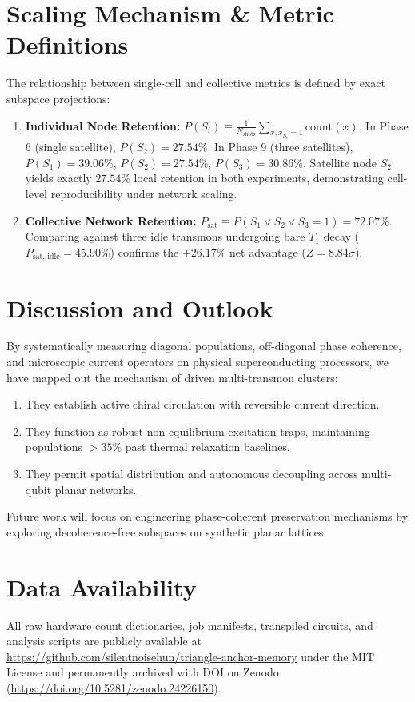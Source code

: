 \documentclass[aps,pra,twocolumn,superscriptaddress,floatfix,10pt]{revtex4-2}
\begin{document}
\section{Scaling Mechanism \& Metric Definitions}
The relationship between single-cell and collective metrics is defined by exact subspace projections:
\begin{enumerate}
    \item \textbf{Individual Node Retention:} $P(S_i) \equiv \frac{1}{N_{\text{shots}}} \sum_{x, x_{S_i}=1} \text{count}(x)$. In Phase 6 (single satellite), $P(S_2) = \mathbf{27.54\%}$. In Phase 9 (three satellites), $P(S_1) = \mathbf{39.06\%}$, $P(S_2) = \mathbf{27.54\%}$, $P(S_3) = \mathbf{30.86\%}$. Satellite node $S_2$ yields exactly $27.54\%$ local retention in both experiments, demonstrating cell-level reproducibility under network scaling.
    \item \textbf{Collective Network Retention:} $P_{\text{sat}} \equiv P(S_1 \lor S_2 \lor S_3 = 1) = \mathbf{72.07\%}$. Comparing against three idle transmons undergoing bare $T_1$ decay ($P_{\text{sat, idle}} = 45.90\%$) confirms the $+26.17\%$ net advantage ($Z = 8.84\sigma$).
\end{enumerate}

\section{Discussion and Outlook}
By systematically measuring diagonal populations, off-diagonal phase coherence, and microscopic current operators on physical superconducting processors, we have mapped out the mechanism of driven multi-transmon clusters:
\begin{enumerate}
    \item They establish active chiral circulation with reversible current direction.
    \item They function as robust non-equilibrium excitation traps, maintaining populations $>35\%$ past thermal relaxation baselines.
    \item They permit spatial distribution and autonomous decoupling across multi-qubit planar networks.
\end{enumerate}
Future work will focus on engineering phase-coherent preservation mechanisms by exploring decoherence-free subspaces on synthetic planar lattices.

\section*{Data Availability}
All raw hardware count dictionaries, job manifests, transpiled circuits, and analysis scripts are publicly available at \url{https://github.com/silentnoisehun/triangle-anchor-memory} under the MIT License and permanently archived with DOI on Zenodo (\url{https://doi.org/10.5281/zenodo.24226150}).


\end{document}
